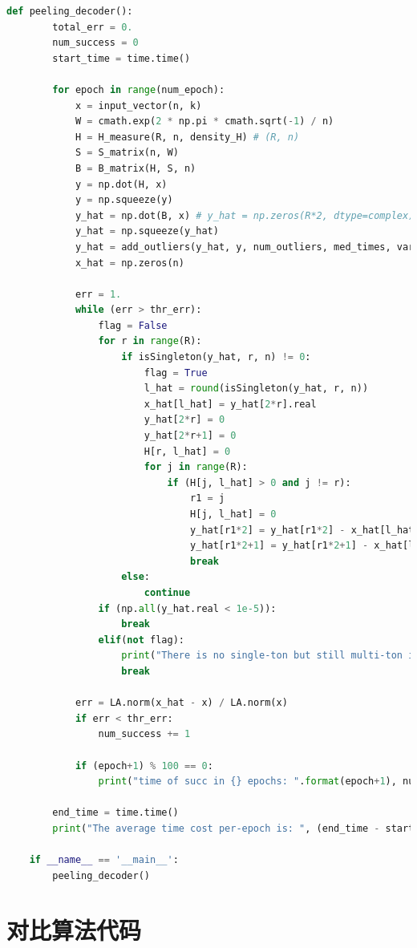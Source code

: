 \documentclass[AutoFakeBold]{LZUThesis}
\begin{document}
\begin{lstlisting}[language = python]
    def peeling_decoder():
        total_err = 0.
        num_success = 0
        start_time = time.time()
        
        for epoch in range(num_epoch):
            x = input_vector(n, k)
            W = cmath.exp(2 * np.pi * cmath.sqrt(-1) / n)
            H = H_measure(R, n, density_H) # (R, n)
            S = S_matrix(n, W)
            B = B_matrix(H, S, n)
            y = np.dot(H, x)
            y = np.squeeze(y)
            y_hat = np.dot(B, x) # y_hat = np.zeros(R*2, dtype=complex)
            y_hat = np.squeeze(y_hat)
            y_hat = add_outliers(y_hat, y, num_outliers, med_times, var_outliers, R=R, W=W)
            x_hat = np.zeros(n)
            
            err = 1.
            while (err > thr_err):
                flag = False
                for r in range(R):
                    if isSingleton(y_hat, r, n) != 0:
                        flag = True
                        l_hat = round(isSingleton(y_hat, r, n))
                        x_hat[l_hat] = y_hat[2*r].real
                        y_hat[2*r] = 0
                        y_hat[2*r+1] = 0
                        H[r, l_hat] = 0
                        for j in range(R):
                            if (H[j, l_hat] > 0 and j != r):
                                r1 = j
                                H[j, l_hat] = 0
                                y_hat[r1*2] = y_hat[r1*2] - x_hat[l_hat]
                                y_hat[r1*2+1] = y_hat[r1*2+1] - x_hat[l_hat] * np.power(W, l_hat)
                                break
                    else:
                        continue
                if (np.all(y_hat.real < 1e-5)):
                    break
                elif(not flag):
                    print("There is no single-ton but still multi-ton in y_hat!\n")
                    break
    
            err = LA.norm(x_hat - x) / LA.norm(x)
            if err < thr_err:
                num_success += 1

            if (epoch+1) % 100 == 0:
                print("time of succ in {} epochs: ".format(epoch+1), num_success)
                
        end_time = time.time()
        print("The average time cost per-epoch is: ", (end_time - start_time)/num_epoch)
    
    if __name__ == '__main__':
        peeling_decoder()
\end{lstlisting}

\section{对比算法代码}
\end{document}

